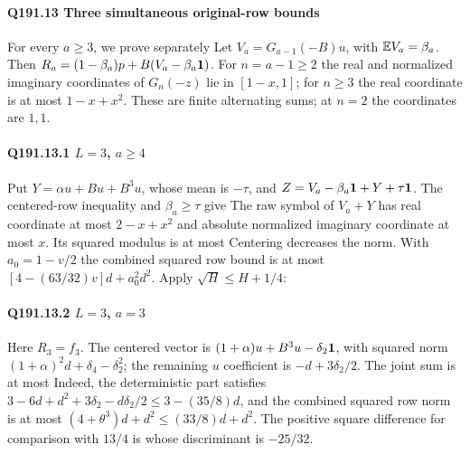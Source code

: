\paragraph{Q191.13 Three simultaneous original-row bounds}\label{part:Q191.13}
For every $a\ge\allowbreak 3$, we prove separately
Let $V_a=\allowbreak G_{a-1}(-B)u$, with $\mathbb E V_a=\allowbreak \beta_a$. Then
$R_a=\allowbreak (1-\beta_a)p+B(V_a-\beta_a\mathbf1)$. For $n=\allowbreak a-1\ge\allowbreak 2$ the real
and normalized imaginary coordinates of $G_n(-z)$ lie in $[1-x,\allowbreak 1]$;
for $n\ge\allowbreak 3$ the real coordinate is at most $1-x+x^2$.
These are finite alternating sums; at $n=\allowbreak 2$ the coordinates are $1,\allowbreak 1$.

\paragraph{Q191.13.1 $L=\allowbreak 3$, $a\ge\allowbreak 4$}
Put $Y=\allowbreak \alpha u+Bu+B^3u$, whose mean is $-\tau$, and
$Z=\allowbreak V_a-\beta_a\mathbf1+Y+\tau\mathbf1$. The centered-row inequality and
$\beta_a\ge\allowbreak \tau$ give
The raw symbol of $V_a+Y$ has real coordinate at most $2-x+x^2$ and
absolute normalized imaginary coordinate at most $x$. Its squared modulus is
at most
Centering decreases the norm. With $a_0=\allowbreak 1-v/2$ the combined squared
row bound is at most $[4-(63/32)v]d+a_0^2d^2$. Apply
$\sqrt H\le\allowbreak  H+1/4$:

\paragraph{Q191.13.2 $L=\allowbreak 3$, $a=\allowbreak 3$}
Here $R_3=\allowbreak f_3$. The centered vector is
$(1+\alpha)u+B^3u-\delta_2\mathbf1$, with squared norm
$(1+\alpha)^2d+\delta_4-\delta_2^2$; the remaining $u$ coefficient is
$-d+3\delta_2/2$. The joint sum is at most
Indeed, the deterministic part satisfies
$3-6d+d^2+3\delta_2-d\delta_2/2\le\allowbreak 3-(35/8)d$, and the combined
squared row norm is at most $(4+\theta^3)d+d^2\le\allowbreak (33/8)d+d^2$.
The positive square difference for comparison with $13/4$ is
whose discriminant is $-25/32$.

